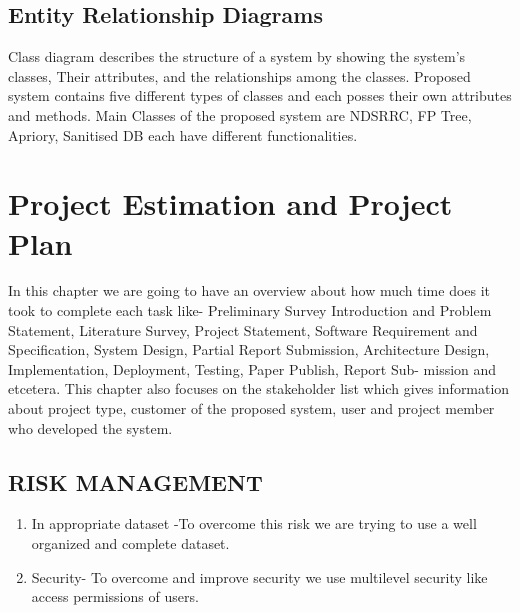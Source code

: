 \documentclass[12pt]{report}
\begin{document}
\clearpage
\justifying
\setlength{\parindent}{4em}
\setlength{\parskip}{0.5em}
\renewcommand{\baselinestretch}{1.5}
\normalsize
\subsection{ Entity Relationship Diagrams}
Class diagram describes the structure of a system by showing the system’s classes, Their
attributes, and the relationships among the classes. Proposed system contains five different 
types of classes and each posses their own attributes and methods. Main Classes of the 
proposed system are NDSRRC, FP Tree, Apriory, Sanitised DB each have different 
functionalities.
\vspace{1.5cm}

\clearpage
\centering
\section{ Project Estimation and Project Plan}
\justifying
\setlength{\parindent}{4em}
\setlength{\parskip}{0.5em}
\renewcommand{\baselinestretch}{1.5}
\normalsize In this chapter we are going to have an overview about how much time does it took to complete each task like- Preliminary Survey Introduction and Problem Statement, Literature Survey, Project Statement, Software Requirement and Specification, System Design, Partial Report Submission, Architecture Design, Implementation, Deployment, Testing, Paper Publish, Report Sub- mission and etcetera. This chapter also focuses on the stakeholder list which gives information about project type, customer of the proposed system, user and project member who developed the system.



\subsection{RISK MANAGEMENT}
\justifying
\setlength{\parindent}{4em}
\setlength{\parskip}{0.5em}
\renewcommand{\baselinestretch}{1.5}
\vspace{0.1cm}
\begin{enumerate}
\item In appropriate dataset -To overcome this risk we are trying to use a well organized and complete dataset.
\item Security- To overcome and improve security we use multilevel security like access permissions of users.

\end{enumerate}
\end{document}
